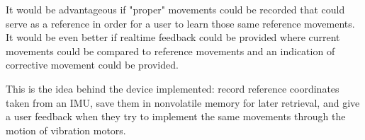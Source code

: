 It would be advantageous if "proper" movements could be recorded that could serve as a reference in order for a user to learn those same reference movements.  It would be even better if realtime feedback could be provided where current movements could be compared to reference movements and an indication of corrective movement could be provided.

This is the idea behind the device implemented: record reference coordinates taken from an IMU, save them in nonvolatile memory for later retrieval, and give a user feedback when they try to implement the same movements through the motion of vibration motors.







